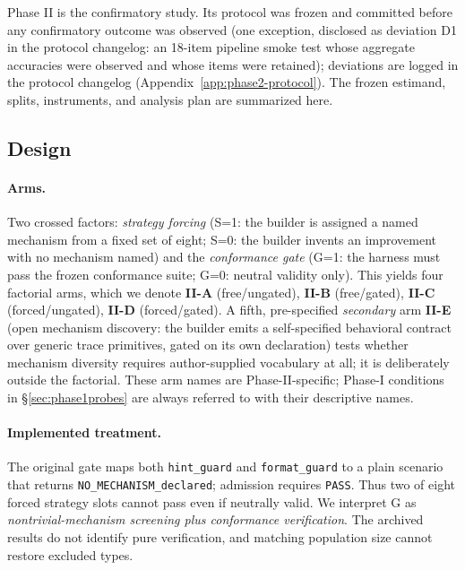 Phase II is the confirmatory study. Its protocol was frozen and committed
before any confirmatory outcome was observed (one exception, disclosed as
deviation D1 in the protocol changelog: an 18-item pipeline smoke test whose
aggregate accuracies were observed and whose items were retained); deviations are logged in the
protocol changelog (Appendix~\ref{app:phase2-protocol}). The frozen
estimand, splits, instruments, and analysis plan are summarized here.

\subsection{Design}\label{sec:p2design}

\paragraph{Arms.} Two crossed factors: \emph{strategy forcing} (S=1: the
builder is assigned a named mechanism from a fixed set of eight; S=0: the
builder invents an improvement with no mechanism named) and the
\emph{conformance gate} (G=1: the harness must pass the frozen conformance
suite; G=0: neutral validity only). This yields four factorial arms, which
we denote \textbf{II-A} (free/ungated), \textbf{II-B} (free/gated),
\textbf{II-C} (forced/ungated), \textbf{II-D} (forced/gated). A fifth,
pre-specified \emph{secondary} arm \textbf{II-E} (open mechanism discovery:
the builder emits a self-specified behavioral contract over generic trace
primitives, gated on its own declaration) tests whether mechanism diversity
requires author-supplied vocabulary at all; it is deliberately outside the
factorial. These arm names are Phase-II-specific; Phase-I conditions in
\S\ref{sec:phase1probes} are always referred to with their descriptive
names.

\paragraph{Implemented treatment.} The original gate maps both
\texttt{hint\_guard} and \texttt{format\_guard} to a plain scenario that
returns \texttt{NO\_MECHANISM\_declared}; admission requires \texttt{PASS}.
Thus two of eight forced strategy slots cannot pass even if neutrally
valid. We interpret G as \emph{nontrivial-mechanism screening plus
conformance verification}. The archived results do not identify pure
verification, and matching population size cannot restore excluded types.

